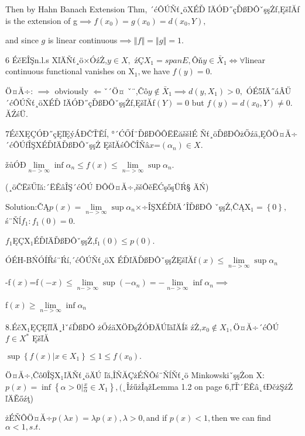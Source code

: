 \documentclass{article}
\begin{document}
\begin{CJK}{GBK}{song}
Then by Hahn Banach Extension Thm, ´ćÔÚŇť¸öXÉĎ%
ľÄÓĐ˝çĎßĐÔˇşşŻf,ĘšľĂf
is the extension of g$\implies f\left( x_{0}\right) =g\left( x_{0}\right)
=d\left( x_{0},Y\right) ,$

and since $g$ is linear continuous$\implies \left\Vert f\right\Vert
=\left\Vert g\right\Vert =1.$

6 ÉčEÎŞn.l.s XľÄŇť¸ö×ÓźŻ,$y\in X,$%
źÇ$X_{1}=spanE,$Ôň$y\in \bar{X}_{1}\iff \forall $linear
continuous functional vanishes on X$_{1},$we have $f\left( y\right) =0.$

Ö¤Ă÷: $\implies $ obviously $\Longleftarrow $ˇ´Ö¤%
ˇ¨,Čô$y\notin \bar{X}_{1}\implies d\left( y,X_{1}\right) >0,$%
ÓÉ5ľÄ˝áÂŰ´ćÔÚŇť¸öXÉĎ%
ľÄÓĐ˝çĎßĐÔˇşşŻf,ĘšľĂf$%
\left( Y\right) =0$ but $f\left( y\right) =d\left( x_{0},Y\right) \neq 0.$%
ĂŹśÜ.

7ÉčXĘÇÓĐ˝çĘľĘýÁĐČŤĚĺ,%
°´ĆŐÍ¨ĎßĐÔÔËËăššłÉ%
Ňť¸öĎßĐÔżŐźä,ĘÔÖ¤Ă÷%
´ćÔÚfÎŞXÉĎľÄĎßĐÔˇşşŻ%
ĘšľĂśÔČÎŇâ$x$=$\left( \alpha _{n}\right) \in
X. $

žůÓĐ$\underset{n->\infty }{\lim }\inf \alpha _{n}\leq f\left(
x\right) \leq \underset{n->\infty }{\lim }\sup \alpha _{n}.$

(¸öČËšŰľă:´ËĚâÎŞ´ćÔÚ%
ĐÔÖ¤Ă÷,ššÔěËĆşőşÜŔ§%
ÄŃ)

Solution:\bigskip ČĄ$p\left( x\right) =\underset{n->\infty }{\lim }%
\sup \alpha _{n}$×÷ÎŞXÉĎľÄ´ÎĎßĐÔ%
ˇşşŻ,ČĄX$_{1}=\left\{ 0\right\} ,$ś¨Ňĺ$%
f_{1}:f_{1}\left( 0\right) =0.$

$f_{1}$ĘÇX$_{1}$ÉĎľÄĎßĐÔˇşşŻ,f$%
_{1}\left( 0\right) \leq p\left( 0\right) .$

ÓÉH-BŃÓÍŘś¨Ŕí,´ćÔÚŇť¸öX%
ÉĎľÄĎßĐÔˇşşŻĘšľĂf$\left(
x\right) \leq \underset{n->\infty }{\lim }\sup \alpha _{n}$

-f$\left( x\right) $=f$\left( -x\right) \leq \underset{n->\infty }{\lim }%
\sup \left( -\alpha _{n}\right) =-\underset{n->\infty }{\lim }\inf \alpha
_{n}\implies $

f$\left( x\right) \geq \underset{n->\infty }{\lim }\inf \alpha _{n}$

8.ÉčX$_{1}$ĘÇĘľľÄ¸łˇśĎßĐÔ%
żŐźäXÖĐşŹÓĐÄÚľăľÄÍš%
źŻ,$x_{0}\notin X_{1},$Ö¤Ă÷´ćÔÚ$f\in X^{\ast }$%
ĘšľĂ

$\sup \left\{ f\left( x\right) |x\in X_{1}\right\} \leq 1\leq f\left(
x_{0}\right) .$

Ö¤Ă÷,Čô0ÎŞX$_{1}$ľÄŇť¸öÄÚ%
ľă,ÎŇĂÇżÉŇÔś¨ŇĺŇť¸ö%
MinkowskiˇşşŻon X: $p\left( x\right) =\inf \left\{ \alpha >0|%
\frac{x}{\alpha }\in X_{1}\right\} ,($˛ÎźűżÎąžLemma
1.2 on page 6,ľŤ´ËĚâ˛ťĐčżŞźŻ%
ľÄĚőźţ)

\bigskip żÉŇÔÖ¤Ă÷$p\left( \lambda x\right) =\lambda
p\left( x\right) ,\lambda >0,$and if $p\left( x\right) <1,$then we can find $%
\alpha <1,s.t.$


\end{CJK}
\end{document}

